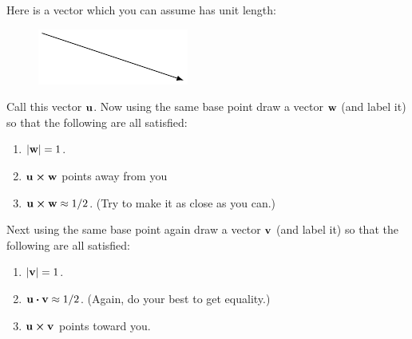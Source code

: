 \documentclass[12pt,answers]{exam}
\begin{document}
\begin{questions}
  \question Here is a vector which you can assume has unit length:
  \begin{figure}[H]
    \centering
    \vspace{.5in}
    \includegraphics{graphics/2018-fall-final-vb-1.pdf}
    \vspace{.5in}
  \end{figure}
  Call this vector $\vb{u}$. Now using the same base point draw a vector $\vb{w}$ (and label it) so that the following are all satisfied:
  \begin{enumerate}[label=(\alph*)]
    \item $|\vb{w}| = 1$.
    \item $\vb{u} \cross \vb{w}$ points away from you
    \item $\vb{u} \cross \vb{w} \approx 1/2$. (Try to make it as close as you can.)
  \end{enumerate}
  Next using the same base point again draw a vector $\vb{v}$ (and label it) so that the following are all satisfied:
  \begin{enumerate}[label=(\alph*)]
    \item $|\vb{v}| = 1$.
    \item $\vb{u} \vdot \vb{v} \approx 1/2$. (Again, do your best to get equality.)
    \item $\vb{u} \cross \vb v$ points toward you.
  \end{enumerate}
  \begin{solution}
    

\end{solution}
\end{questions}
\end{document}

